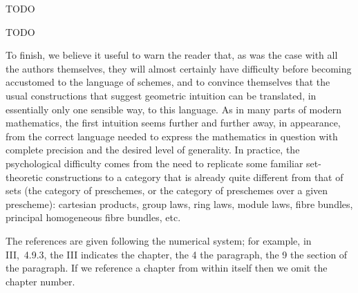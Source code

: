 \documentclass[../main.tex]{subfiles}
\begin{document}
\asttri

TODO

\asttri

TODO

\asttri

To finish, we believe it useful to warn the reader that, as was the case with all the authors themselves, they will almost certainly have difficulty before becoming accustomed to the language of schemes, and to convince themselves that the usual constructions that suggest geometric intuition can be translated, in essentially only one sensible way, to this language.
As in many parts of modern mathematics, the first intuition seems further and further away, in appearance, from the correct language needed to express the mathematics in question with complete precision and the desired level of generality.
In practice, the psychological difficulty comes from the need to replicate some familiar set-theoretic constructions to a category that is already quite different from that of sets (the category of preschemes, or the category of preschemes over a given prescheme): cartesian products, group laws, ring laws, module laws, fibre bundles, principal homogeneous fibre bundles, etc.


\asttri

The references are given following the numerical system; for example, in III,~4.9.3, the III indicates the chapter, the 4 the paragraph, the 9 the section of the paragraph.
If we reference a chapter from within itself then we omit the chapter number.
\end{document}
